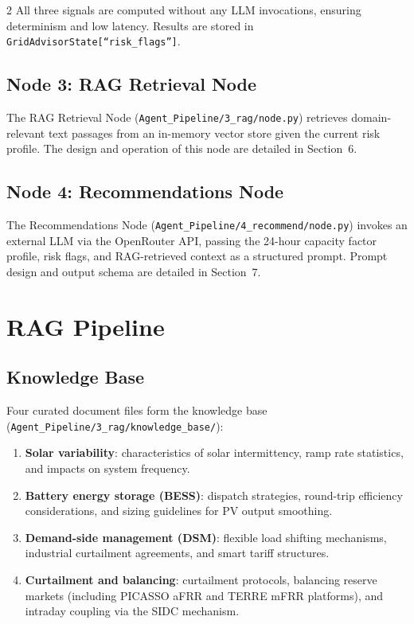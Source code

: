 \documentclass[11pt]{article}
\begin{document}
\begin{multicols}{2}
All three signals are computed without any LLM invocations, ensuring
determinism and low latency. Results are stored in
\texttt{GridAdvisorState[``risk\_flags'']}.

\subsection{Node 3: RAG Retrieval Node}

The RAG Retrieval Node (\texttt{Agent\_Pipeline/3\_rag/node.py}) retrieves
domain-relevant text passages from an in-memory vector store given the current
risk profile. The design and operation of this node are detailed in Section~6.

\subsection{Node 4: Recommendations Node}

The Recommendations Node
(\texttt{Agent\_Pipeline/4\_recommend/node.py}) invokes an external LLM via the
OpenRouter API, passing the 24-hour capacity factor profile, risk flags, and
RAG-retrieved context as a structured prompt. Prompt design and output schema
are detailed in Section~7.

\section{RAG Pipeline}

\subsection{Knowledge Base}

Four curated document files form the knowledge base
(\texttt{Agent\_Pipeline/3\_rag/knowledge\_base/}):

\begin{enumerate}
  \item \textbf{Solar variability}: characteristics of solar intermittency,
        ramp rate statistics, and impacts on system frequency.
  \item \textbf{Battery energy storage (BESS)}: dispatch strategies, round-trip
        efficiency considerations, and sizing guidelines for PV output
        smoothing.
  \item \textbf{Demand-side management (DSM)}: flexible load shifting
        mechanisms, industrial curtailment agreements, and smart tariff
        structures.
  \item \textbf{Curtailment and balancing}: curtailment protocols, balancing
        reserve markets (including PICASSO aFRR and TERRE mFRR platforms),
        and intraday coupling via the SIDC mechanism.
\end{enumerate}


\end{multicols}
\end{document}
